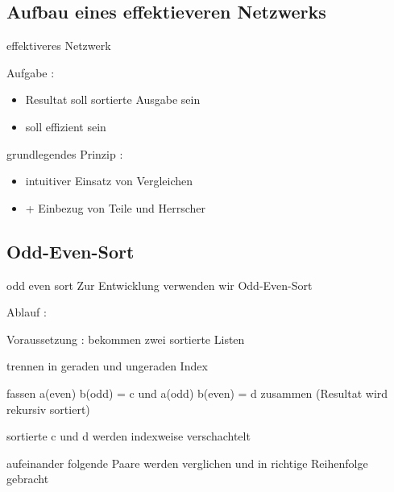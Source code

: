 \documentclass[ucs,9pt]{beamer}
\begin{document}
\subsection*{Aufbau eines effektieveren Netzwerks}
\begin{frame}{effektiveres Netzwerk}
 {Aufgabe :
            \begin{itemize}
                \item Resultat soll sortierte Ausgabe sein
                \item \alert{soll effizient sein}
            \end{itemize}}
 {grundlegendes Prinzip :
            \begin{itemize}
                \item intuitiver Einsatz von Vergleichen
                \item[]\alert{+ Einbezug von Teile und Herrscher}
            \end{itemize}}
\end{frame}

\subsection{Odd-Even-Sort}
\begin{frame}{odd even sort}
Zur Entwicklung verwenden wir Odd-Even-Sort\\
\vspace{1cm}
 {Ablauf :
\begin{itemize}
 {\item Voraussetzung : bekommen zwei sortierte Listen}
 {\item trennen in geraden und ungeraden Index}
 {\item fassen a(even) b(odd) = c und a(odd) b(even) = d zusammen (Resultat wird rekursiv sortiert)}
 {\item sortierte c und d werden indexweise verschachtelt}
 {\item aufeinander folgende Paare werden verglichen und in richtige Reihenfolge gebracht}
\end{itemize}}
\end{frame}
\end{document}
